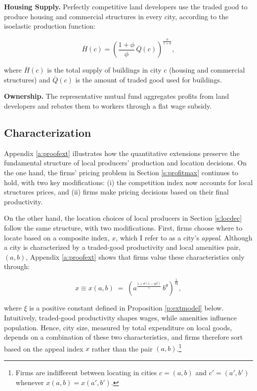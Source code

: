 \textbf{Housing Supply.} Perfectly competitive land developers use the traded good to produce housing and commercial structures in every city, according to the isoelastic production function:

\begin{equation}\label{eq:housingprdfn}
	\overline{H}(c) = \left(\frac{1+\phi}{\phi} \, \overline{Q}(c)\right)^{\frac{\phi}{1+\phi}},
\end{equation}

where $\overline{H}(c)$ is the total supply of buildings in city $c$ (housing and commercial structures) and $\overline{Q}(c)$ is the amount of traded good used for buildings.

\textbf{Ownership.} The representative mutual fund aggregates profits from land developers and rebates them to workers through a flat wage subsidy. 

\subsection{Characterization}
Appendix \ref{a:proofext} illustrates how the quantitative extensions preserve the fundamental structure of local producers’ production and location decisions. On the one hand, the firms’ pricing problem in Section \ref{s:profitmax} continues to hold, with two key modifications: (i) the competition index now accounts for local structures prices, and (ii) firms make pricing decisions based on their final productivity.

On the other hand, the location choices of local producers in Section \ref{s:locdec} follow the same structure, with two modifications. First, firms choose where to locate based on a composite index, $x$, which I refer to as a city’s \textit{appeal}. Although a city is characterized by a traded-good productivity and local amenities pair, $(a,b)$, Appendix \ref{a:proofext} shows that firms value these characteristics only through:

\begin{equation}\label{eq:localadv}
  x \equiv x(a,b) \;=\; \left(a^{\frac{1+\theta(1-\eta \beta)}{\gamma}}\, b^{\theta}\right)^{\frac{1}{\theta\xi}},
\end{equation}

where $\xi$ is a positive constant defined in Proposition \ref{p:extmodel} below. Intuitively, traded-good productivity shapes wages, while amenities influence population. Hence, city size, measured by total expenditure on local goods, depends on a combination of these two characteristics, and firms therefore sort based on the appeal index $x$ rather than the pair $(a,b)$.\footnote{Firms are indifferent between locating in cities $c=(a,b)$ and $c'=(a',b')$ whenever $x(a,b)=x(a',b')$.}

